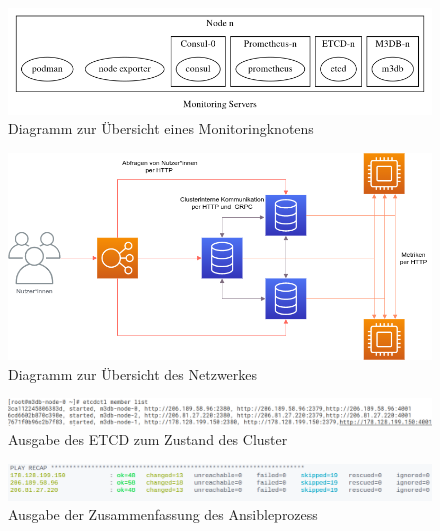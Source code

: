 \documentclass[11pt,a4paper]{article}
\begin{document}
\newpage
\listoffigures
\newpage
\begin{figure}[!htbp]
  \centering
  \includegraphics[width=16cm]{assets/node_configuration_diagram.png}
  \caption{Diagramm zur Übersicht eines Monitoringknotens}
  \label{figure:node}
\end{figure}

\begin{figure}[!htbp]
  \centering
  \includegraphics[width=16cm]{assets/netzwerkdiagramm.png}
  \caption{Diagramm zur Übersicht des Netzwerkes}
  \label{figure:network}
\end{figure}

\begin{figure}[!htbp]
  \centering
  \includegraphics[width=16cm]{assets/etcd_member_list.png}
  \caption{Ausgabe des ETCD zum Zustand des Cluster}
  \label{figure:member-list}
\end{figure}

\begin{figure}[!htbp]
  \centering
  \includegraphics[width=16cm]{assets/ansible_run_recap.png}
  \caption{Ausgabe der Zusammenfassung des Ansibleprozess}
  \label{figure:ansible-recap}
\end{figure}
\end{document}

